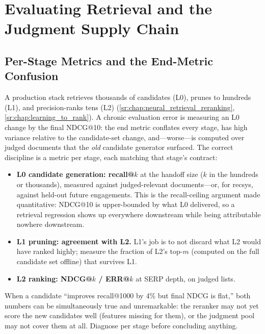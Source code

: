 \section{Evaluating Retrieval and the Judgment Supply Chain}
\label{sr:sec:eval_retrieval_judgments}

\subsection{Per-Stage Metrics and the End-Metric Confusion}

A production stack retrieves thousands of candidates (L0), prunes to hundreds (L1), and precision-ranks tens (L2) (\ref{sr:chap:neural_retrieval_reranking}, \ref{sr:chap:learning_to_rank}). A chronic evaluation error is measuring an L0 change by the final NDCG@10: the end metric conflates every stage, has high variance relative to the candidate-set change, and---worse---is computed over judged documents that the \textit{old} candidate generator surfaced. The correct discipline is a metric per stage, each matching that stage's contract:

\begin{itemize}
    \item \textbf{L0 candidate generation: recall@$k$} at the handoff size ($k$ in the hundreds or thousands), measured against judged-relevant documents---or, for recsys, against held-out future engagements. This is the recall-ceiling argument made quantitative: NDCG@10 is upper-bounded by what L0 delivered, so a retrieval regression shows up everywhere downstream while being attributable nowhere downstream.
    \item \textbf{L1 pruning: agreement with L2.} L1's job is to not discard what L2 would have ranked highly; measure the fraction of L2's top-$m$ (computed on the full candidate set offline) that survives L1.
    \item \textbf{L2 ranking: NDCG@$k$ / ERR@$k$} at SERP depth, on judged lists.
\end{itemize}

When a candidate ``improves recall@1000 by 4\% but final NDCG is flat,'' both numbers can be simultaneously true and unremarkable: the reranker may not yet score the new candidates well (features missing for them), or the judgment pool may not cover them at all. Diagnose per stage before concluding anything.

